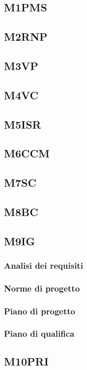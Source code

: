 {{{{{{{{{{{{\subsection{M1PMS}
\subsection{M2RNP}
\subsection{M3VP}
\subsection{M4VC}
\subsection{M5ISR}
\subsection{M6CCM}
\subsection{M7SC}
\subsection{M8BC}
\subsection{M9IG}
\subsubsection{Analisi dei requisiti}
\subsubsection{Norme di progetto}
\subsubsection{Piano di progetto}

\subsubsection{Piano di qualifica}
\subsection{M10PRI}
}}}}}}}}}}}}
